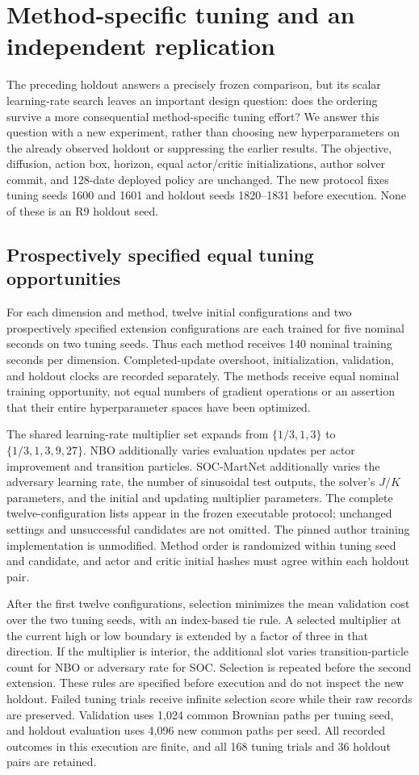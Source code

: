 \section{Method-specific tuning and an independent replication}\label{r11:robustness}
The preceding holdout answers a precisely frozen comparison, but its scalar learning-rate search leaves an important design question: does the ordering survive a more consequential method-specific tuning effort? We answer this question with a new experiment, rather than choosing new hyperparameters on the already observed holdout or suppressing the earlier results. The objective, diffusion, action box, horizon, equal actor/critic initializations, author solver commit, and 128-date deployed policy are unchanged. The new protocol fixes tuning seeds 1600 and 1601 and holdout seeds 1820--1831 before execution. None of these is an R9 holdout seed.

\subsection{Prospectively specified equal tuning opportunities}
For each dimension and method, twelve initial configurations and two prospectively specified extension configurations are each trained for five nominal seconds on two tuning seeds. Thus each method receives 140 nominal training seconds per dimension. Completed-update overshoot, initialization, validation, and holdout clocks are recorded separately. The methods receive equal nominal training opportunity, not equal numbers of gradient operations or an assertion that their entire hyperparameter spaces have been optimized.

The shared learning-rate multiplier set expands from $\{1/3,1,3\}$ to $\{1/3,1,3,9,27\}$. NBO additionally varies evaluation updates per actor improvement and transition particles. SOC-MartNet additionally varies the adversary learning rate, the number of sinusoidal test outputs, the solver's $J/K$ parameters, and the initial and updating multiplier parameters. The complete twelve-configuration lists appear in the frozen executable protocol; unchanged settings and unsuccessful candidates are not omitted. The pinned author training implementation is unmodified. Method order is randomized within tuning seed and candidate, and actor and critic initial hashes must agree within each holdout pair.

After the first twelve configurations, selection minimizes the mean validation cost over the two tuning seeds, with an index-based tie rule. A selected multiplier at the current high or low boundary is extended by a factor of three in that direction. If the multiplier is interior, the additional slot varies transition-particle count for NBO or adversary rate for SOC. Selection is repeated before the second extension. These rules are specified before execution and do not inspect the new holdout. Failed tuning trials receive infinite selection score while their raw records are preserved. Validation uses 1,024 common Brownian paths per tuning seed, and holdout evaluation uses 4,096 new common paths per seed. All recorded outcomes in this execution are finite, and all 168 tuning trials and 36 holdout pairs are retained.


